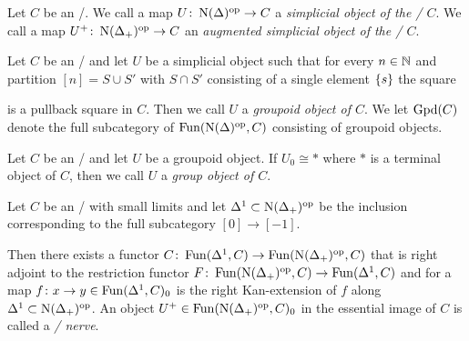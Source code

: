 \begin{definition} %
    Let $C$ be an \inftycat/. 
    We call a map $U\colon\operatorname{N}(\Delta)^{\operatorname{op}}\to C$ a \emph{simplicial object of the \inftycat/ $C$}.
    We call a map $U^+\colon\operatorname{N}(\Delta_+)^{\operatorname{op}}\to C$ an \emph{augmented simplicial object of the \inftycat/ $C$}.
\end{definition}
\begin{definition}
    Let $C$ be an \inftycat/ and let $U$ be a simplicial object such that for every $n\in\mathbb{N}$ and partition $[n]=S\cup S'$ with $S\cap S'$ consisting of a single element $\left\lbrace s\right\rbrace$ the square
    \begin{center}
    \end{center}
    is a pullback square in $C$.
    Then we call $U$ a \emph{groupoid object of $C$}.
    We let $\operatorname{Gpd}(C)$ denote the full subcategory of $\operatorname{Fun}(\operatorname{N}(\Delta)^{\operatorname{op}},C)$ consisting of groupoid objects.
\end{definition}
\begin{definition}
    Let $C$ be an \inftycat/ and let $U$ be a groupoid object.
    If $U_0\cong *$ where $*$ is a terminal object of $C$, then we call $U$ a \emph{group object of $C$}.
\end{definition}
\begin{definition}
    Let $C$ be an \inftycat/ with small limits and let $\Delta^1\subset\operatorname{N}(\Delta_+)^{\operatorname{op}}$ be the inclusion corresponding to the full subcategory $[0]\to[-1]$.
    
    Then there exists a functor $C\colon\operatorname{Fun}(\Delta^1,C)\to\operatorname{Fun}(\operatorname{N}(\Delta_+)^{\operatorname{op}},C)$ that is right adjoint to the restriction functor $F\colon\operatorname{Fun}(\operatorname{N}(\Delta_+)^{\operatorname{op}},C)\to\operatorname{Fun}(\Delta^1,C)$ and for a map $f\colon x\to y\in\operatorname{Fun}(\Delta^1,C)_0$ is the right Kan-extension of $f$ along $\Delta^1\subset\operatorname{N}(\Delta_+)^{\operatorname{op}}$.
    An object $U^+\in\operatorname{Fun}(\operatorname{N}(\Delta_+)^{\operatorname{op}},C)_0$ in the essential image of $C$ is called a \emph{\Cech/ nerve}.
\end{definition}
